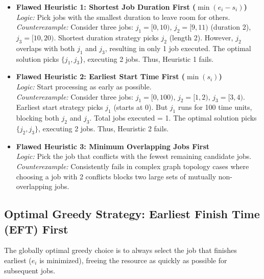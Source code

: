 \documentclass[10pt,journal,compsoc,onecolumn]{IEEEtran}
\begin{document}
\begin{itemize}
    \item \textbf{Flawed Heuristic 1: Shortest Job Duration First ($\min(e_i - s_i)$)} \\
    \emph{Logic:} Pick jobs with the smallest duration to leave room for others. \\
    \emph{Counterexample:} Consider three jobs: $j_1 = [0, 10)$, $j_2 = [9, 11)$ (duration 2), $j_3 = [10, 20)$.
    Shortest duration strategy picks $j_2$ (length 2). However, $j_2$ overlaps with both $j_1$ and $j_3$, resulting in only 1 job executed. The optimal solution picks $\{j_1, j_3\}$, executing 2 jobs. Thus, Heuristic 1 fails.

    \item \textbf{Flawed Heuristic 2: Earliest Start Time First ($\min(s_i)$)} \\
    \emph{Logic:} Start processing as early as possible. \\
    \emph{Counterexample:} Consider three jobs: $j_1 = [0, 100)$, $j_2 = [1, 2)$, $j_3 = [3, 4)$.
    Earliest start strategy picks $j_1$ (starts at 0). But $j_1$ runs for 100 time units, blocking both $j_2$ and $j_3$. Total jobs executed = 1. The optimal solution picks $\{j_2, j_3\}$, executing 2 jobs. Thus, Heuristic 2 fails.

    \item \textbf{Flawed Heuristic 3: Minimum Overlapping Jobs First} \\
    \emph{Logic:} Pick the job that conflicts with the fewest remaining candidate jobs. \\
    \emph{Counterexample:} Consistently fails in complex graph topology cases where choosing a job with 2 conflicts blocks two large sets of mutually non-overlapping jobs.
\end{itemize}

\subsection{Optimal Greedy Strategy: Earliest Finish Time (EFT) First}

The globally optimal greedy choice is to always select the job that finishes earliest ($e_i$ is minimized), freeing the resource as quickly as possible for subsequent jobs.
\end{document}
